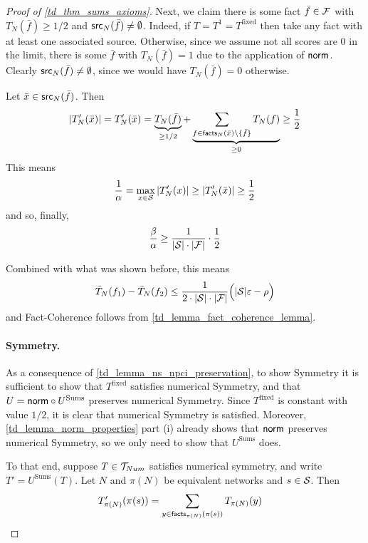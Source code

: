\begin{proof}[Proof of \cref{td_thm_sums_axioms}]
Next, we claim there is some fact $\bar{f} \in \F$ with $T_N(\bar{f}) \ge 1 /
2$ and $\src_N(\bar{f}) \ne \emptyset$. Indeed, if $T = T^1 = T^{\text{fixed}}$
then take any fact with at least one associated source.\footnotemark{}
Otherwise, since we assume not all scores are 0 in the limit, there is some
$\bar{f}$ with $T_N(\bar{f}) = 1$ due to the application of $\norm$. Clearly
$\src_N(\bar{f}) \ne \emptyset$, since we would have $T_N(\bar{f}) = 0$
otherwise.


Let $\bar{x} \in \src_N(\bar{f})$. Then
\[
    |T'_N(\bar{x})|
    = T'_N(\bar{x})
    = \underbrace{T_N(\bar{f})}_{\ge 1 / 2}
       + \underbrace{
           \sum_{f \in \facts_N(\bar{x}) \setminus \{\bar{f}\}}{
               T_N(f)
           }
         }_{\ge 0}
    \ge \frac{1}{2}
\]
This means
\[
    \frac{1}{\alpha}
    = \max_{x \in \S}{|T'_N(x)|}
    \ge |T'_N(\bar{x})|
    \ge \frac{1}{2}
\]
and so, finally,
\[
    \frac{\beta}{\alpha}
    \ge \frac{1}{|\S| \cdot |\F|} \cdot \frac{1}{2}
\]

Combined with what was shown before, this means
\[
    \tilde{T}_N(f_1) - \tilde{T}_N(f_2)
    \le \frac{1}{2 \cdot |\S| \cdot |\F|} \Big(|\S|\epsilon - \rho\Big)
\]
and Fact-Coherence follows from \cref{td_lemma_fact_coherence_lemma}.

\paragraph{Symmetry.} As a consequence of \cref{td_lemma_ns_npci_preservation}, to
show Symmetry it is sufficient to show that $T^{\text{fixed}}$ satisfies
numerical Symmetry, and that $U = \norm \circ U^{\text{Sums}}$ preserves
numerical Symmetry. Since $T^{\text{fixed}}$ is constant with value $1/2$, it
is clear that numerical Symmetry is satisfied.  Moreover,
\cref{td_lemma_norm_properties} part (i) already shows that $\norm$ preserves
numerical Symmetry, so we only need to show that $U^{\text{Sums}}$ does.

To that end, suppose $T \in \num$ satisfies numerical symmetry, and write $T' =
U^{\text{Sums}}(T)$. Let $N$ and $\pi(N)$ be equivalent networks and $s \in
\S$. Then
\begin{align*}
    T'_{\pi(N)}(\pi(s))
    &= \sum_{y \in \facts_{\pi(N)}(\pi(s))}{T_{\pi(N)}(y)}
\end{align*}


\end{proof}
